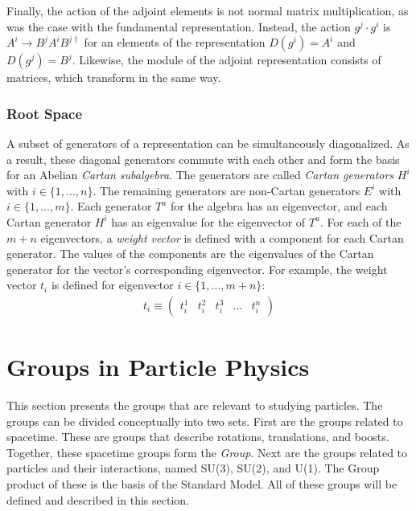 Finally, the action of the adjoint elements is not normal matrix multiplication, as was the case with the fundamental representation.
Instead, the action $g^j\cdot g^i$ is $A^i\to B^jA^iB^{j\dagger}$ for an elements of the representation $D(g^i)=A^i$ and $D(g^j)=B^j$. \check
Likewise, the module of the adjoint representation consists of \nxn matrices, which transform in the same way.

\subsubsection{Root Space}
A subset of generators of a representation can be simultaneously diagonalized.
As a result, these diagonal generators commute with each other and form the basis for an Abelian \emph{Cartan subalgebra}.
The generators are called \emph{Cartan generators} $H^i$ with $i\in\{1,...,n\}$.
The remaining generators are non-Cartan generators $E^i$ with $i\in\{1,...,m\}$.
Each generator $T^a$ for the algebra has an eigenvector, and each Cartan generator $H^i$ has an eigenvalue for the eigenvector of $T^a$.
For each of the $m+n$ eigenvectors, a \emph{weight vector} is defined with a component for each Cartan generator.
The values of the components are the eigenvalues of the Cartan generator for the vector's corresponding eigenvector.
For example, the weight vector $t_i$ is defined for eigenvector $i\in\{1,...,m+n\}$:
\begin{equation}\begin{split}
t_i\equiv \begin{pmatrix}t_i^1&t_i^2&t_i^3&...&t_i^{n}\end{pmatrix}
\end{split}\end{equation} 

\section{Groups in Particle Physics}\label{sec:particlePhysicsGroups}

This section presents the groups that are relevant to studying particles.
The groups can be divided conceptually into two sets.
First are the groups related to spacetime.
These are groups that describe rotations, translations, and boosts.
Together, these spacetime groups form the \emph{\poincare Group}.
Next are the groups related to particles and their interactions, named SU(3), SU(2), and U(1).
The Group product of these is the basis of the Standard Model.
All of these groups will be defined and described in this section.

